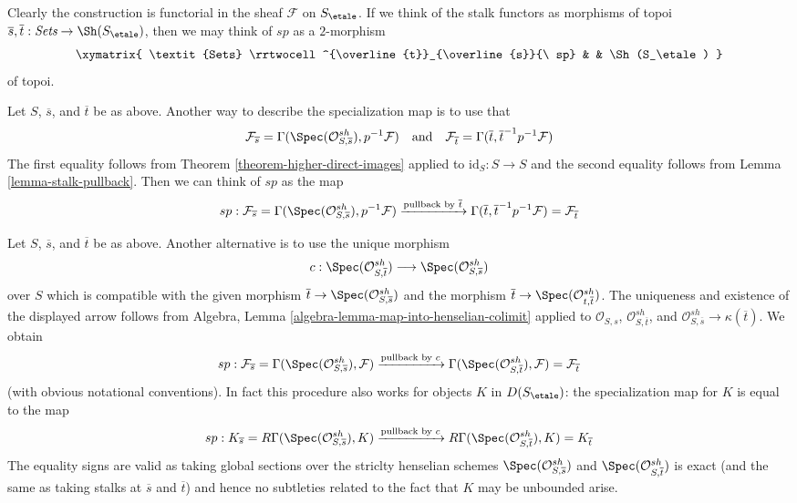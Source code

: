 \medskip\noindent
Clearly the construction is functorial in the sheaf $\mathcal{F}$ on
$S_\etale$. If we think of the stalk functors as morphisms of topoi
$\overline{s}, \overline{t} : \textit{Sets} \to \Sh(S_\etale)$, then
we may think of $sp$ as a $2$-morphism
$$
\xymatrix{
\textit{Sets}
\rrtwocell^{\overline{t}}_{\overline{s}}{\ sp}
&
&
\Sh(S_\etale)
}
$$
of topoi.

\begin{remark}
\label{remark-alternative-sp}
Let $S$, $\overline{s}$, and $\overline{t}$ be as above.
Another way to describe the specialization map is to use that
$$
\mathcal{F}_{\overline{s}} =
\Gamma(\Spec(\mathcal{O}^{sh}_{S, \overline{s}}), p^{-1}\mathcal{F})
\quad\text{and}\quad
\mathcal{F}_{\overline{t}} = \Gamma(\overline{t},
\overline{t}^{-1}p^{-1}\mathcal{F})
$$
The first equality follows from Theorem \ref{theorem-higher-direct-images}
applied to $\text{id}_S : S \to S$ and the second equality follows
from Lemma \ref{lemma-stalk-pullback}. Then we can think of $sp$
as the map
$$
sp :
\mathcal{F}_{\overline{s}} =
\Gamma(\Spec(\mathcal{O}^{sh}_{S, \overline{s}}), p^{-1}\mathcal{F})
\xrightarrow{\text{pullback by }\overline{t}}
\Gamma(\overline{t}, \overline{t}^{-1}p^{-1}\mathcal{F}) =
\mathcal{F}_{\overline{t}}
$$
\end{remark}

\begin{remark}
\label{remark-another-sp}
Let $S$, $\overline{s}$, and $\overline{t}$ be as above.
Another alternative is to use the unique morphism
$$
c :
\Spec(\mathcal{O}^{sh}_{S, \overline{t}})
\longrightarrow
\Spec(\mathcal{O}^{sh}_{S, \overline{s}})
$$
over $S$ which is compatible with the given morphism
$\overline{t} \to \Spec(\mathcal{O}^{sh}_{S, \overline{s}})$
and the morphism
$\overline{t} \to \Spec(\mathcal{O}^{sh}_{t, \overline{t}})$.
The uniqueness and existence of the displayed arrow
follows from Algebra, Lemma \ref{algebra-lemma-map-into-henselian-colimit}
applied to $\mathcal{O}_{S, s}$, $\mathcal{O}^{sh}_{S, \overline{t}}$, and
$\mathcal{O}^{sh}_{S, \overline{s}} \to \kappa(\overline{t})$.
We obtain
$$
sp :
\mathcal{F}_{\overline{s}} =
\Gamma(\Spec(\mathcal{O}^{sh}_{S, \overline{s}}), \mathcal{F})
\xrightarrow{\text{pullback by }c}
\Gamma(\Spec(\mathcal{O}^{sh}_{S, \overline{t}}), \mathcal{F}) =
\mathcal{F}_{\overline{t}}
$$
(with obvious notational conventions).
In fact this procedure also works for objects $K$ in $D(S_\etale)$:
the specialization map for $K$ is equal to the map
$$
sp :
K_{\overline{s}} =
R\Gamma(\Spec(\mathcal{O}^{sh}_{S, \overline{s}}), K)
\xrightarrow{\text{pullback by }c}
R\Gamma(\Spec(\mathcal{O}^{sh}_{S, \overline{t}}), K) =
K_{\overline{t}}
$$
The equality signs are valid as taking global sections over
the striclty henselian schemes
$\Spec(\mathcal{O}^{sh}_{S, \overline{s}})$ and
$\Spec(\mathcal{O}^{sh}_{S, \overline{t}})$
is exact (and the same as taking stalks at $\overline{s}$ and $\overline{t}$)
and hence no subtleties related to the fact that $K$ may be unbounded
arise.
\end{remark}

